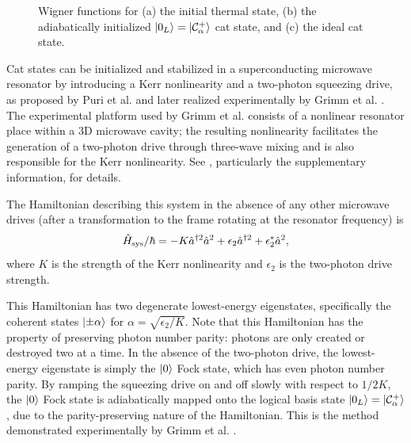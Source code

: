 \begin{figure}[t]
\begin{subfigure}[b]{0.32\textwidth}
         \caption{}
         \label{fig:ideal_cat}
     \end{subfigure}
        \caption{Wigner functions for (a) the initial thermal state, (b) the adiabatically initialized $\ket{0_L} = \ket{\mathcal{C}_\alpha^+}$ cat state, and (c) the ideal cat state.}
        \label{fig:initialization_wigner}
\end{figure}

Cat states can be initialized and stabilized in a superconducting microwave resonator by introducing a Kerr nonlinearity and a two-photon squeezing drive, as proposed by Puri et al. and later realized experimentally by Grimm et al. \cite{puri_2017,grimm_2020}.
The experimental platform used by Grimm et al. consists of a nonlinear resonator place within a 3D microwave cavity; the resulting nonlinearity facilitates the generation of a two-photon drive through three-wave mixing and is also responsible for the Kerr nonlinearity.
See \cite{grimm_2020}, particularly the supplementary information, for details.

The Hamiltonian describing this system in the absence of any other microwave drives (after a transformation to the frame rotating at the resonator frequency) is
\begin{equation}
    \hat{H}_{\rm sys} / \hbar = -K \hat{a}^{\dag 2} \hat{a}^2 + \epsilon_2 \hat{a}^{\dag 2} + \epsilon_2^* \hat{a}^2,
\end{equation}
where $K$ is the strength of the Kerr nonlinearity and $\epsilon_2$ is the two-photon drive strength.

This Hamiltonian has two degenerate lowest-energy eigenstates, specifically the coherent states $\ket{\pm \alpha}$ for $\alpha = \sqrt{\epsilon_2 / K}$.
Note that this Hamiltonian has the property of preserving photon number parity: photons are only created or destroyed two at a time.
In the absence of the two-photon drive, the lowest-energy eigenstate is simply the $\ket{0}$ Fock state, which has even photon number parity.
By ramping the squeezing drive on and off slowly with respect to $1/2K$, the $\ket{0}$ Fock state is adiabatically mapped onto the logical basis state $\ket{0_L} = \ket{\mathcal{C}_\alpha^+}$, due to the parity-preserving nature of the Hamiltonian.
This is the method demonstrated experimentally by Grimm et al. \cite{grimm_2020}.

